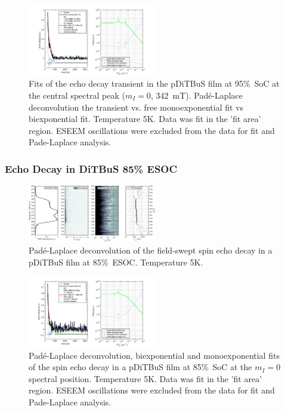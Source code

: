 \begin{figure}[ht!]
\center
	\includegraphics[width=0.5\textwidth]{./pulse/figures/Figure_S11.pdf}
	\caption{Fits of the echo decay transient in the pDiTBuS film at 95\%~SoC at the central spectral peak ($m_I=0$, 342~mT). Pad{\'e}-Laplace deconvolution the transient vs. free monoexponential fit vs biexponential fit. Temperature 5K. Data was fit in the 'fit area' region. ESEEM oscillations were excluded from the data for fit and Pade-Laplace analysis.}
	\label{fig:Figure_S11}
\end{figure}


\newpage
\subsubsection{Echo Decay in DiTBuS 85\% ESOC}

\begin{figure}[h]
\center
	\includegraphics[width=0.5\textwidth]{./pulse/figures/Figure_S12.png}
	\caption{Pad{\'e}-Laplace deconvolution of the field-swept spin echo decay in a pDiTBuS film at 85\%~ESOC. Temperature 5K.}
	\label{fig:Figure_S12}
\end{figure}

\begin{figure}[ht!]
\center
	\includegraphics[width=0.5\textwidth]{./pulse/figures/Figure_S13.pdf}
	\caption{Pad{\'e}-Laplace deconvolution, biexponential and monoexponential fits of the spin echo decay in a pDiTBuS film at 85\%~SoC at the $m_I=0$ spectral position. Temperature 5K. Data was fit in the 'fit area' region. ESEEM oscillations were excluded from the data for fit and Pade-Laplace analysis.}
	\label{fig:Figure_S13}
\end{figure}



